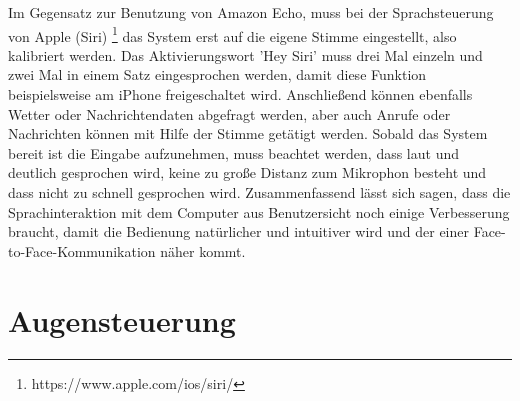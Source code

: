 Im Gegensatz zur Benutzung von Amazon Echo, muss bei der Sprachsteuerung von Apple (Siri)%
\footnote{https://www.apple.com/ios/siri/}
%
 das System erst auf die eigene Stimme eingestellt, also kalibriert werden. Das Aktivierungswort 'Hey Siri' muss drei Mal einzeln und zwei Mal in einem Satz eingesprochen werden, damit diese Funktion beispielsweise am iPhone freigeschaltet wird. Anschließend können ebenfalls Wetter oder Nachrichtendaten abgefragt werden, aber auch Anrufe oder Nachrichten können mit Hilfe der Stimme getätigt werden. 
\newline \newline
Sobald das System bereit ist die Eingabe aufzunehmen, muss beachtet werden, dass laut und deutlich gesprochen wird, keine zu große Distanz zum Mikrophon besteht und dass nicht zu schnell gesprochen wird.
\newline \newline
Zusammenfassend lässt sich sagen, dass die Sprachinteraktion mit dem Computer aus Benutzersicht noch einige Verbesserung braucht, damit die Bedienung natürlicher und intuitiver wird und der einer Face-to-Face-Kommunikation näher kommt.

\section{Augensteuerung}
\label{cha:Augensteuerung}

